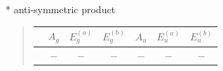 \documentclass[fleqn,8pt,landscape]{jsarticle}
\begin{document}
* anti-symmetric product
\begin{quote}
\begin{tabular}{ccccccc} \hline \hline
 & $ A_{g} $ & $ E_{g}^{(a)} $ & $ E_{g}^{(b)} $ & $ A_{u} $ & $ E_{u}^{(a)} $ & $ E_{u}^{(b)} $ \\ \hline
$  $ & $ - $ & $ - $ & $ - $ & $ - $ & $ - $ & $ - $ \\
 \hline \hline
\end{tabular}
\end{quote}
\end{document}
